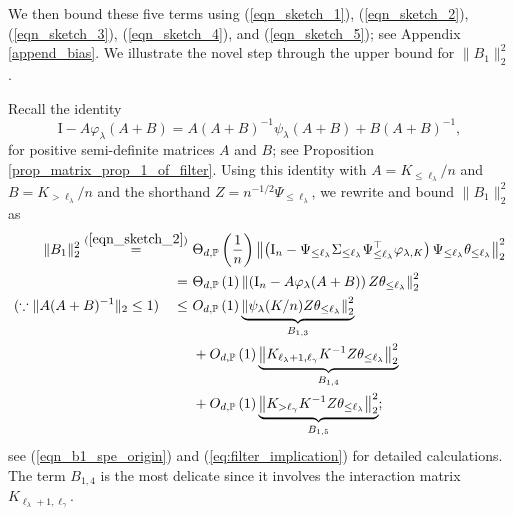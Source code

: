 \documentclass{article}
\theoremstyle{plain}
\theoremstyle{definition}
\theoremstyle{remark}
\newcommand{\reg}{\varphi_\lambda}
\newcommand{\rem}{\psi_\lambda}
\begin{document}
\begin{appendix}
We then bound these five terms using (\ref{eqn_sketch_1}), (\ref{eqn_sketch_2}), (\ref{eqn_sketch_3}), (\ref{eqn_sketch_4}), and (\ref{eqn_sketch_5}); see Appendix \ref{append_bias}. 
We illustrate the novel step through the upper bound for $\|B_1\|_2^2$. 

Recall the identity
\begin{equation*}
    \mathrm{I}-A\reg(A+B) = A(A+B)^{-1}\rem(A+B) + B(A+B)^{-1},
\end{equation*}
for positive semi-definite matrices $A$ and $B$;
see Proposition \ref{prop_matrix_prop_1_of_filter}.
Using this identity with $A=K_{\leq \ell_{\lambda}} / n$ and $B=K_{> \ell_{\lambda}} / n$ and the shorthand $Z = n^{-1/2}\Psi_{\leq \ell_{\lambda}}$, we rewrite and bound $\| B_{1} \|_{2}^{2}$ as
\begin{equation*}
    \begin{aligned}
        \|B_1\|_{2}^{2} \overset{(\ref{eqn_sketch_2})}{=} &~ 
        \Theta_{d, \mathbb{P}}\left(\frac{1}{n}\right)
                \left\| \left( \mathrm{I}_{n} - \Psi_{\leq \ell_{\lambda}}\Sigma_{\leq \ell_{\lambda}} \Psi^{\top}_{\leq \ell_{\lambda}} \varphi_{\lambda, K} \right) 
                \Psi_{\leq \ell_{\lambda}}\theta_{\leq \ell_{\lambda}} \right\|_{2}^{2}\\
                = &~
                \Theta_{d, \mathbb{P}}\left(1\right) \left\| \left( \mathrm{I}_{n} - A \reg(A+B)\right) Z\theta_{\leq \ell_{\lambda}}\right\|_{2}^{2}
                \\
            (\because \|A(A+B)^{-1}\|_2 \leq 1) \quad   \leq  &~  O_{d, \mathbb{P}}\left(1\right)
        \underbrace{\left\| \rem(K/n)  
                Z\theta_{\leq \ell_{\lambda}} \right\|_{2}^{2}}_{B_{1,3}}\\ 
                &~+
                O_{d, \mathbb{P}}\left(  1\right)
                \underbrace{\left\| K_{\ell_{\lambda}+1, \ell_{\gamma}} K^{-1} Z \theta_{\leq \ell_{\lambda}} \right\|_{2}^{2}}_{B_{1,4}}\\
                &~+
                O_{d, \mathbb{P}}\left(  1\right)
                \underbrace{\left\| K_{>\ell_{\gamma}} K^{-1} Z \theta_{\leq \ell_{\lambda}} \right\|_{2}^{2}}_{B_{1,5}};
    \end{aligned}
\end{equation*}
see (\ref{eqn_b1_spe_origin}) and (\ref{eq:filter_implication}) for detailed calculations.
The term $B_{1,4}$ is the most delicate since it involves the interaction matrix $K_{\ell_{\lambda}+1, \ell_{\gamma}}$. 




\end{appendix}
\end{document}
